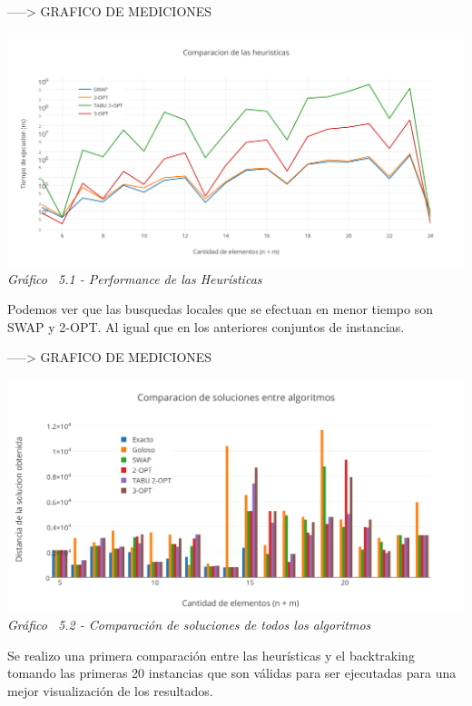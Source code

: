 -----> GRAFICO DE MEDICIONES 
\vspace*{0.3cm} \vspace*{0.3cm}
  \begin{center}
 \includegraphics[scale=0.5]{./EJ5/medicion.png}\\
 {\textit{Gráfico \ 5.1 - Performance de las Heur\'isticas}}
  \end{center}
  \vspace*{0.3cm}


Podemos ver que las busquedas locales que se efectuan en menor tiempo son SWAP y 2-OPT. 
Al igual que en los anteriores conjuntos de instancias.

-----> GRAFICO DE MEDICIONES 
\vspace*{0.3cm} \vspace*{0.3cm}
  \begin{center}
 \includegraphics[scale=0.5]{./EJ5/comparativo.png}\\
 {\textit{Gráfico \ 5.2 - Comparaci\'on de soluciones de todos los algoritmos}}
  \end{center}
  \vspace*{0.3cm}

Se realizo una primera comparaci\'on entre las heur\'isticas y el backtraking tomando las primeras 20 instancias que son v\'alidas para ser ejecutadas para una mejor visualizaci\'on de los resultados.

